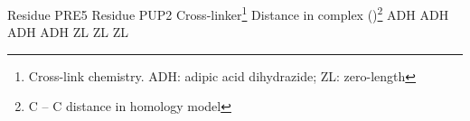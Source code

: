 \startlocalfootnotes
\bTABLE
\setupTABLE[width=broad]
\bTABLEhead
\bTR
\bTD Residue PRE5 \eTD 
\bTD Residue PUP2 \eTD 
\bTD Cross-linker\footnote{Cross-link chemistry. ADH: adipic acid dihydrazide; ZL: zero-length} \eTD 
\bTD Distance in complex (\Angstrom)\footnote{C\low{\m{\alpha}} -- C\low{\m{\alpha}} distance in homology model} \eTD
\eTR
\eTABLEhead
\bTABLEbody
\bTR
{} \eTD {} \eTD \bTD ADH \eTD {} \eTD
\eTR
\bTR
{} \eTD {} \eTD \bTD ADH \eTD {} \eTD
\eTR
\bTR
{} \eTD {} \eTD \bTD ADH \eTD {} \eTD
\eTR
\bTR
{} \eTD {} \eTD \bTD ADH \eTD {} \eTD
\eTR
\bTR
{} \eTD {} \eTD \bTD ZL \eTD {} \eTD
\eTR
\bTR
{} \eTD {} \eTD \bTD ZL \eTD {} \eTD
\eTR
\bTR
{} \eTD {} \eTD \bTD ZL \eTD {} \eTD
\eTR
\eTABLEbody
\eTABLE
\placelocalfootnotes
\stoplocalfootnotes
